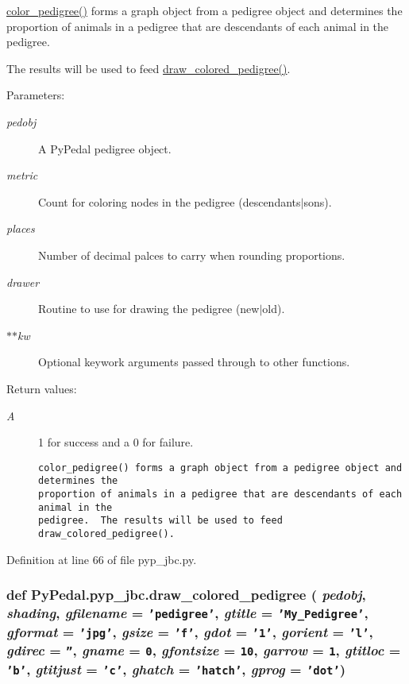 \hyperlink{namespacePyPedal_1_1pyp__jbc_dbc1c88a0fcf403645e7310f6b6da99f}{color\_\-pedigree()} forms a graph object from a pedigree object and determines the proportion of animals in a pedigree that are descendants of each animal in the pedigree. 

The results will be used to feed \hyperlink{namespacePyPedal_1_1pyp__jbc_dd01c0570f87aaac52c6cc89e39dacdb}{draw\_\-colored\_\-pedigree()}. \begin{Desc}
\item[Parameters:]
\begin{description}
\item[{\em pedobj}]A Py\-Pedal pedigree object. \item[{\em metric}]Count for coloring nodes in the pedigree (descendants$|$sons). \item[{\em places}]Number of decimal palces to carry when rounding proportions. \item[{\em drawer}]Routine to use for drawing the pedigree (new$|$old). \item[{\em $\ast$$\ast$kw}]Optional keywork arguments passed through to other functions. \end{description}
\end{Desc}
\begin{Desc}
\item[Return values:]
\begin{description}
\item[{\em A}]1 for success and a 0 for failure.

\footnotesize\begin{verbatim}color_pedigree() forms a graph object from a pedigree object and determines the
proportion of animals in a pedigree that are descendants of each animal in the
pedigree.  The results will be used to feed draw_colored_pedigree().
\end{verbatim}
\normalsize
 \end{description}
\end{Desc}


Definition at line 66 of file pyp\_\-jbc.py.\hypertarget{namespacePyPedal_1_1pyp__jbc_dd01c0570f87aaac52c6cc89e39dacdb}{
\subsubsection[draw\_\-colored\_\-pedigree]{\setlength{\rightskip}{0pt plus 5cm}def Py\-Pedal.pyp\_\-jbc.draw\_\-colored\_\-pedigree ( {\em pedobj},  {\em shading},  {\em gfilename} = {\tt 'pedigree'},  {\em gtitle} = {\tt 'My\_\-Pedigree'},  {\em gformat} = {\tt 'jpg'},  {\em gsize} = {\tt 'f'},  {\em gdot} = {\tt '1'},  {\em gorient} = {\tt 'l'},  {\em gdirec} = {\tt ''},  {\em gname} = {\tt 0},  {\em gfontsize} = {\tt 10},  {\em garrow} = {\tt 1},  {\em gtitloc} = {\tt 'b'},  {\em gtitjust} = {\tt 'c'},  {\em ghatch} = {\tt 'hatch'},  {\em gprog} = {\tt 'dot'})}}
\label{namespacePyPedal_1_1pyp__jbc_dd01c0570f87aaac52c6cc89e39dacdb}


